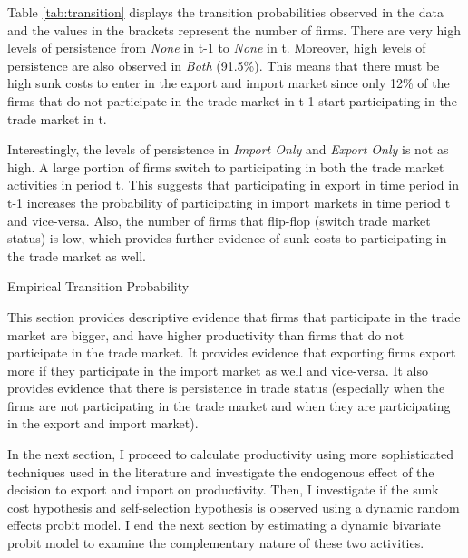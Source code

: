 \documentclass[12pt]{article}
\begin{document}
Table \ref{tab:transition} displays the transition probabilities
observed in the data  and the values in the brackets represent the
number of firms.  There are very high levels of persistence from
\textit{None} in t-1 to \textit{None} in t. Moreover,   high levels of persistence
are also observed in  \textit{Both}  (91.5\%). This means that there must be high sunk
costs to enter in the export and import market since only 12\% of the
firms  that do not participate in the trade market in t-1 start
participating in the trade market in t.

Interestingly, the levels of
persistence in \textit{Import Only} and \textit{Export Only}  is not
as high. A large portion of firms switch to participating in both the trade market
activities in period t. This suggests that participating in export in time
period in t-1 increases the probability of participating in import  markets in time period
t and vice-versa. Also, the number of firms that flip-flop (switch
trade market status) is low, which provides further evidence of sunk costs
to participating in the trade market as well. 

\begin{table}[H]
\begin{center}

\caption{Empirical Transition Probability}
\label{tab:transition}

\end{center}

\end{table}


This section provides descriptive evidence that firms that participate
in the trade market are bigger, and have higher
productivity than firms that do not participate in the trade
market. It provides evidence that exporting firms export more if they
participate in the import market as well and vice-versa. It also
provides evidence that there is persistence in trade status
(especially when the firms are not participating in the trade market
and when they are participating in the export and import market). 

In the next section, I proceed to calculate productivity using more
sophisticated techniques used in the literature and investigate the endogenous effect
of the decision to export and import on productivity. Then, I investigate if the
sunk cost hypothesis and self-selection hypothesis is observed using a
dynamic random effects probit model. I end the next section by
estimating a dynamic bivariate probit model to examine the complementary
nature of these two activities. 
\end{document}
